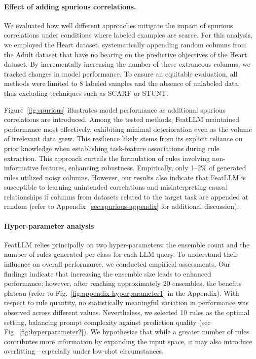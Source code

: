 \vspace*{-0.12in}
\paragraph{Effect of adding spurious correlations.} We evaluated how well different approaches mitigate the impact of spurious correlations under conditions where labeled examples are scarce. For this analysis, we employed the Heart dataset, systematically appending random columns from the Adult dataset that have no bearing on the predictive objectives of the Heart dataset. By incrementally increasing the number of these extraneous columns, we tracked changes in model performance. To ensure an equitable evaluation, all methods were limited to 8 labeled samples and the absence of unlabeled data, thus excluding techniques such as SCARF or STUNT.

Figure~\ref{fig:spurious} illustrates model performance as additional spurious correlations are introduced. Among the tested methods, \textsf{FeatLLM} maintained performance most effectively, exhibiting minimal deterioration even as the volume of irrelevant data grew. This resilience likely stems from its explicit reliance on prior knowledge when establishing task-feature associations during rule extraction. This approach curtails the formulation of rules involving non-informative features, enhancing robustness. Empirically, only 1–2\% of generated rules utilized noisy columns. However, our results also indicate that \textsf{FeatLLM} is susceptible to learning unintended correlations and misinterpreting causal relationships if columns from datasets related to the target task are appended at random (refer to Appendix~\ref{sec:spurious-appendix} for additional discussion).

\vspace*{-0.12in}
\paragraph{Hyper-parameter analysis}
\textsf{FeatLLM} relies principally on two hyper-parameters: the ensemble count and the number of rules generated per class for each LLM query. To understand their influence on overall performance, we conducted empirical assessments. Our findings indicate that increasing the ensemble size leads to enhanced performance; however, after reaching approximately 20 ensembles, the benefits plateau (refer to Fig.~\ref{fig:appendix-hyperparameter1} in the Appendix). With respect to rule quantity, no statistically meaningful variation in performance was observed across different values. Nevertheless, we selected 10 rules as the optimal setting, balancing prompt complexity against prediction quality (see Fig.~\ref{fig:hyperparameter2}). We hypothesize that while a greater number of rules contributes more information by expanding the input space, it may also introduce overfitting—especially under low-shot circumstances.

